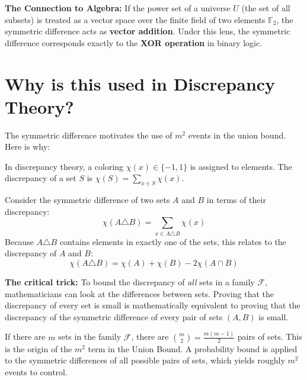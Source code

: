 \documentclass[11pt]{article}
\begin{document}
\textbf{The Connection to Algebra:} If the power set of a universe \(U\) (the set of all subsets) is treated as a vector space over the finite field of two elements \(\mathbb{F}_2\), the symmetric difference acts as \textbf{vector addition}. Under this lens, the symmetric difference corresponds exactly to the \textbf{XOR operation} in binary logic.

\hrulefill

\section{Why is this used in Discrepancy Theory?}

The symmetric difference motivates the use of \(m^2\) events in the union bound. Here is why:

In discrepancy theory, a coloring \(\chi(x) \in \{-1, 1\}\) is assigned to elements. The discrepancy of a set \(S\) is \(\chi(S) = \sum_{x \in S} \chi(x)\).

Consider the symmetric difference of two sets \(A\) and \(B\) in terms of their discrepancy:
\[
 \chi(A \triangle B) = \sum_{x \in A \triangle B} \chi(x) 
\]
Because \(A \triangle B\) contains elements in exactly one of the sets, this relates to the discrepancy of \(A\) and \(B\):
\[
 \chi(A \triangle B) = \chi(A) + \chi(B) - 2\chi(A \cap B) 
\]

\textbf{The critical trick:} 
To bound the discrepancy of \emph{all} sets in a family \(\mathcal{F}\), mathematicians can look at the differences between sets. Proving that the discrepancy of every set is small is mathematically equivalent to proving that the discrepancy of the symmetric difference of every pair of sets \((A, B)\) is small. 

If there are \(m\) sets in the family \(\mathcal{F}\), there are \(\binom{m}{2} = \frac{m(m-1)}{2}\) pairs of sets. This is the origin of the \textbf{\(m^2\)} term in the Union Bound. A probability bound is applied to the symmetric differences of all possible pairs of sets, which yields roughly \(m^2\) events to control.
\end{document}
